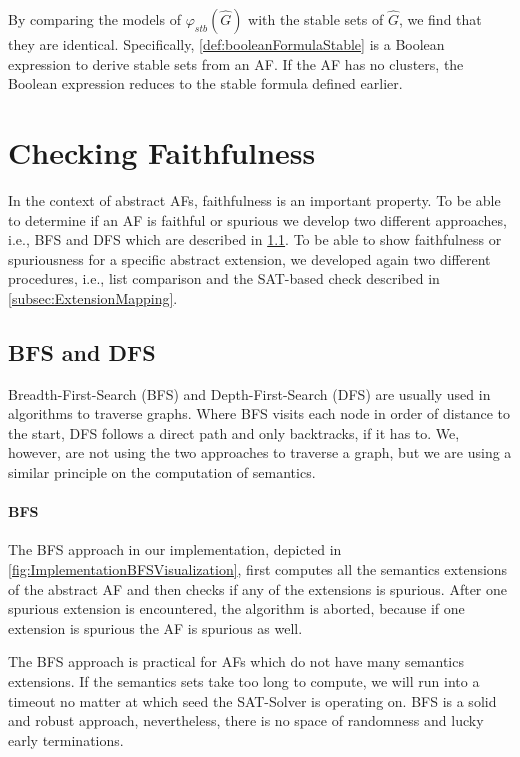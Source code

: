 By comparing the models of $\varphi_{stb}(\hat{G})$ with the stable sets of $\hat{G}$, we find that they are identical. Specifically, \cref{def:booleanFormulaStable} is a Boolean expression to derive stable sets from an AF. If the AF has no clusters, the Boolean expression reduces to the stable formula defined earlier.


\section{Checking Faithfulness}
\label{sec:AlgorithmCheckingFaithfulness}
In the context of abstract AFs, faithfulness is an important property. To be able to determine if an AF is faithful or spurious we develop two different approaches, i.e., BFS and DFS which are described in \cref{subsec:BFSandDFSAlgorithm}. To be able to show faithfulness or spuriousness for a specific abstract extension, we developed again two different procedures, i.e., list comparison and the SAT-based check described in \cref{subsec:ExtensionMapping}.

\subsection{BFS and DFS}
\label{subsec:BFSandDFSAlgorithm}
Breadth-First-Search (BFS) and Depth-First-Search (DFS) are usually used in algorithms to traverse graphs. Where BFS visits each node in order of distance to the start, DFS follows a direct path and only backtracks, if it has to. We, however, are not using the two approaches to traverse a graph, but we are using a similar principle on the computation of semantics.

\paragraph{BFS} The BFS approach in our implementation, depicted in \cref{fig:ImplementationBFSVisualization}, first computes all the semantics extensions of the abstract AF and then checks if any of the extensions is spurious. After one spurious extension is encountered, the algorithm is aborted, because if one extension is spurious the AF is spurious as well.

The BFS approach is practical for AFs which do not have many semantics extensions. If the semantics sets take too long to compute, we will run into a timeout no matter at which seed the SAT-Solver is operating on. BFS is a solid and robust approach, nevertheless, there is no space of randomness and lucky early terminations.

